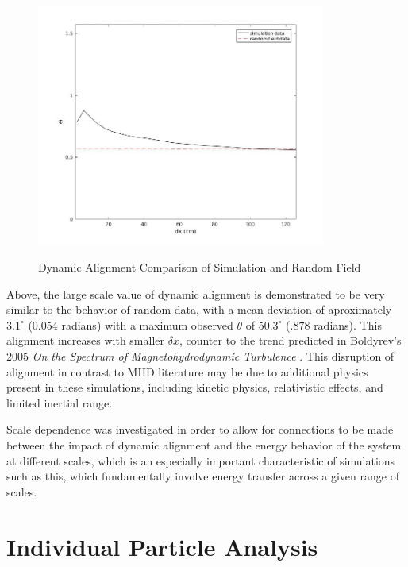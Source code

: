 \documentclass[journal, a4paper]{IEEEtran}
\begin{document}
\vspace{.4cm}
\begin{figure}[H]
\caption{Dynamic Alignment Comparison of Simulation and Random Field}
\includegraphics[width=9.5cm]{dynamicalignment.jpg}
\label{figure3}
\centering
\end{figure}


Above, the large scale value of dynamic alignment is demonstrated to be very similar to the behavior of random data, with a mean deviation of aproximately $3.1^{\circ}$ ($0.054$ radians) with a maximum observed $\theta$ of $50.3^{\circ}$ ($.878$ radians). This alignment increases with smaller $\delta x$, counter to the trend predicted in Boldyrev's 2005 \textit{On the Spectrum of Magnetohydrodynamic Turbulence} \cite{boldyrev2}. This disruption of alignment in contrast to MHD literature may be due to additional physics present in these simulations, including kinetic physics\cite{zhdankin}, relativistic effects, and limited inertial range.

Scale dependence was investigated in order to allow for connections to be made between the impact of dynamic alignment and the energy behavior of the system at different scales, which is an especially important characteristic of simulations such as this, which fundamentally involve energy transfer across a given range of scales.
 
\vspace{.4cm}
\section{Individual Particle Analysis}
\vspace{.4cm}
\end{document}
